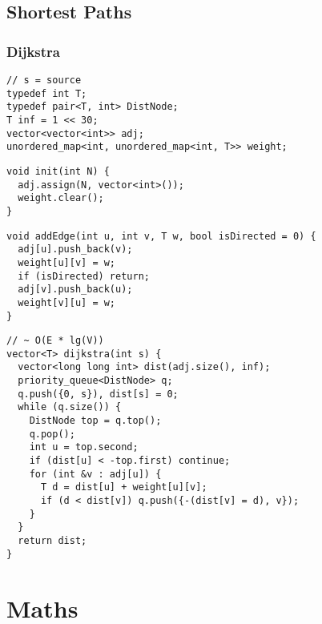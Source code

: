 \documentclass[twoside]{article}
\begin{document}
\begin{multicols*}{2}
\subsection*{Shortest Paths}
\vspace{2em}
\subsubsectionfont{\large\bfseries\sffamily\underline}
\subsubsection*{Dijkstra}
\begin{verbatim}
// s = source
typedef int T;
typedef pair<T, int> DistNode;
T inf = 1 << 30;
vector<vector<int>> adj;
unordered_map<int, unordered_map<int, T>> weight;
\end{verbatim}
\vspace{-12pt}
\begin{verbatim}
void init(int N) {
  adj.assign(N, vector<int>());
  weight.clear();
}
\end{verbatim}
\vspace{-12pt}
\begin{verbatim}
void addEdge(int u, int v, T w, bool isDirected = 0) {
  adj[u].push_back(v);
  weight[u][v] = w;
  if (isDirected) return;
  adj[v].push_back(u);
  weight[v][u] = w;
}
\end{verbatim}
\vspace{-12pt}
\begin{verbatim}
// ~ O(E * lg(V))
vector<T> dijkstra(int s) {
  vector<long long int> dist(adj.size(), inf);
  priority_queue<DistNode> q;
  q.push({0, s}), dist[s] = 0;
  while (q.size()) {
    DistNode top = q.top();
    q.pop();
    int u = top.second;
    if (dist[u] < -top.first) continue;
    for (int &v : adj[u]) {
      T d = dist[u] + weight[u][v];
      if (d < dist[v]) q.push({-(dist[v] = d), v});
    }
  }
  return dist;
}
\end{verbatim}

\sectionfont{\bfseries\sffamily\centering\Huge}
\vspace{1em}
\section*{Maths}
\vspace{3em}
\subsectionfont{\bfseries\sffamily\centering\LARGE}
\vspace{0em}

\end{multicols*}
\end{document}
